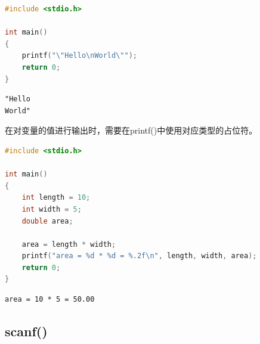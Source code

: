 
\begin{lstlisting}[language=C]
#include <stdio.h>

int main()
{
	printf("\"Hello\nWorld\"");
	return 0;
}
\end{lstlisting}

\begin{tcolorbox}
	\begin{verbatim}
"Hello
World"
	\end{verbatim}
\end{tcolorbox}

在对变量的值进行输出时，需要在printf()中使用对应类型的占位符。\\

\begin{table}[H]
	\centering
	\caption{占位符}
\end{table}

\vspace{0.5cm}


\begin{lstlisting}[language=C]
#include <stdio.h>

int main()
{
	int length = 10;
	int width = 5;
	double area;

	area = length * width;
	printf("area = %d * %d = %.2f\n", length, width, area);
	return 0;
}
\end{lstlisting}

\begin{tcolorbox}
	\begin{verbatim}
area = 10 * 5 = 50.00
	\end{verbatim}
\end{tcolorbox}

\vspace{0.5cm}

\subsection{scanf()}

